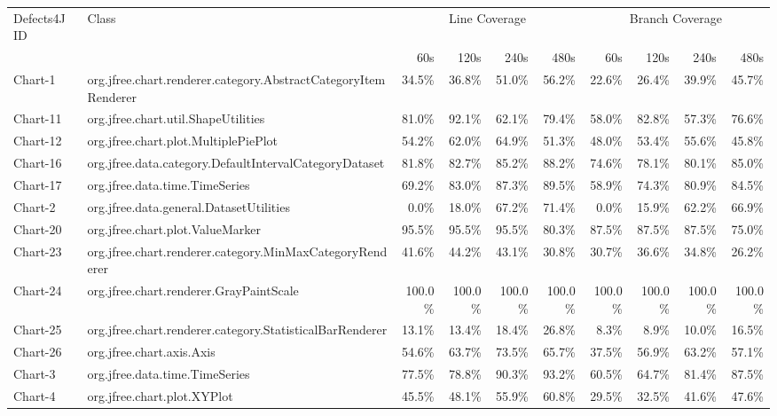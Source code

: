 \begin{tabular}{ ll rrrr rrrr}\toprule 
 Defects4J ID & Class &  \multicolumn{4}{c}{Line Coverage}  &  \multicolumn{4}{c}{Branch Coverage} \\ 
 & & 60s & 120s & 240s & 480s & 60s & 120s & 240s & 480s \\ 
\midrule 
Chart-1 &  org.jfree.chart.renderer.category.AbstractCategoryItemRenderer &  34.5\% &  36.8\% &  51.0\% &  56.2\% &  22.6\% &  26.4\% &  39.9\% &  45.7\%\\ 
Chart-11 &  org.jfree.chart.util.ShapeUtilities &  81.0\% &  92.1\% &  62.1\% &  79.4\% &  58.0\% &  82.8\% &  57.3\% &  76.6\%\\ 
Chart-12 &  org.jfree.chart.plot.MultiplePiePlot &  54.2\% &  62.0\% &  64.9\% &  51.3\% &  48.0\% &  53.4\% &  55.6\% &  45.8\%\\ 
Chart-16 &  org.jfree.data.category.DefaultIntervalCategoryDataset &  81.8\% &  82.7\% &  85.2\% &  88.2\% &  74.6\% &  78.1\% &  80.1\% &  85.0\%\\ 
Chart-17 &  org.jfree.data.time.TimeSeries &  69.2\% &  83.0\% &  87.3\% &  89.5\% &  58.9\% &  74.3\% &  80.9\% &  84.5\%\\ 
Chart-2 &  org.jfree.data.general.DatasetUtilities &  0.0\% &  18.0\% &  67.2\% &  71.4\% &  0.0\% &  15.9\% &  62.2\% &  66.9\%\\ 
Chart-20 &  org.jfree.chart.plot.ValueMarker &  95.5\% &  95.5\% &  95.5\% &  80.3\% &  87.5\% &  87.5\% &  87.5\% &  75.0\%\\ 
Chart-23 &  org.jfree.chart.renderer.category.MinMaxCategoryRenderer &  41.6\% &  44.2\% &  43.1\% &  30.8\% &  30.7\% &  36.6\% &  34.8\% &  26.2\%\\ 
Chart-24 &  org.jfree.chart.renderer.GrayPaintScale &  100.0\% &  100.0\% &  100.0\% &  100.0\% &  100.0\% &  100.0\% &  100.0\% &  100.0\%\\ 
Chart-25 &  org.jfree.chart.renderer.category.StatisticalBarRenderer &  13.1\% &  13.4\% &  18.4\% &  26.8\% &  8.3\% &  8.9\% &  10.0\% &  16.5\%\\ 
Chart-26 &  org.jfree.chart.axis.Axis &  54.6\% &  63.7\% &  73.5\% &  65.7\% &  37.5\% &  56.9\% &  63.2\% &  57.1\%\\ 
Chart-3 &  org.jfree.data.time.TimeSeries &  77.5\% &  78.8\% &  90.3\% &  93.2\% &  60.5\% &  64.7\% &  81.4\% &  87.5\%\\ 
Chart-4 &  org.jfree.chart.plot.XYPlot &  45.5\% &  48.1\% &  55.9\% &  60.8\% &  29.5\% &  32.5\% &  41.6\% &  47.6\%\\ 

\end{tabular}
